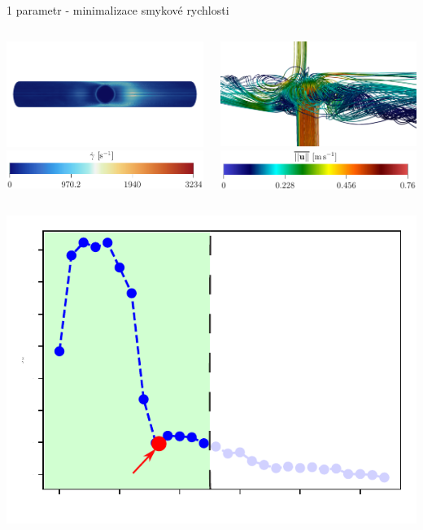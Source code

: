 \documentclass[aspectratio=169,xcolor=dvipsnames]{beamer}
\begin{document}
\begin{frame}{1 parametr - minimalizace smykové rychlosti}
	\begin{columns}
		\begin{column}{.5\textwidth}
			\centering
			\includegraphics[width=1\linewidth, trim={0 0 0 0}, clip]{Images/08stress-top.pdf}
			\includegraphics[width=0.65\linewidth, trim={0 0 0 0}, clip]{Images/stress_leg.pdf}			
		\end{column}
		\begin{column}{.5\textwidth}
			\centering
			\includegraphics[width=1\linewidth, trim={0 0 0 0}, clip]{Images/helix.pdf}
			\includegraphics[width=0.65\linewidth, trim={0 0 0 0}, clip]{Images/mean_velocity_leg.pdf}
		\end{column}
	\end{columns}	
	\vspace{3mm}
	\begin{center}
		\includegraphics[width=.18\linewidth, trim={0 0 0 0}, clip]{Images/stress-mini.pdf}
	\end{center}	
\end{frame}
\end{document}
